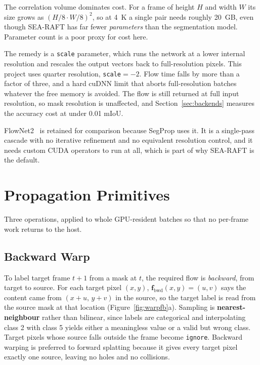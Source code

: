 \documentclass[report.tex]{subfiles}
\begin{document}
The correlation volume dominates cost. For a frame of height $H$ and width
$W$ its size grows as $(H/8 \cdot W/8)^2$, so at \SI{4}{K} a single pair needs
roughly
\SI{20}{GB}, even though SEA-RAFT has far fewer \emph{parameters} than the
segmentation model. Parameter count is a poor proxy for cost here.

The remedy is a \texttt{scale} parameter, which runs the network at a lower
internal resolution and rescales the output vectors back to full-resolution
pixels. This project uses quarter resolution, \texttt{scale}${=}{-}2$. Flow
time falls by more than a factor of three, and a hard cuDNN limit that aborts
full-resolution batches whatever the free memory is avoided. The flow is still
returned at full input resolution, so mask resolution is unaffected, and
Section~\ref{sec:backends} measures the accuracy cost at under \num{0.01}
mIoU.

FlowNet2~\cite{flownet2_2017} is retained for comparison because SegProp uses
it. It is a single-pass cascade with no iterative refinement and no equivalent
resolution control, and it needs custom CUDA operators to run at all, which is
part of why SEA-RAFT is the default.

\section{Propagation Primitives}
\label{sec:primitives}

Three operations, applied to whole GPU-resident batches so that no per-frame
work returns to the host.

\subsection{Backward Warp}
\label{sec:warp}

To label target frame $t{+}1$ from a mask at $t$, the required flow is
\emph{backward}, from target to source. For each target pixel $(x, y)$,
$\mathbf{f}_{\text{bwd}}(x,y) = (u, v)$ says the content came from
$(x{+}u,\, y{+}v)$ in the source, so the target label is read from the source
mask at that location (Figure~\ref{fig:warpfb}a). Sampling is
\textbf{nearest-neighbour} rather than bilinear, since labels are categorical
and interpolating class 2 with class 5 yields either a meaningless value or a
valid but wrong class. Target pixels whose source falls outside the frame
become \texttt{ignore}. Backward warping is preferred to forward splatting
because it gives every target pixel exactly one source, leaving no holes and no
collisions.
\end{document}
